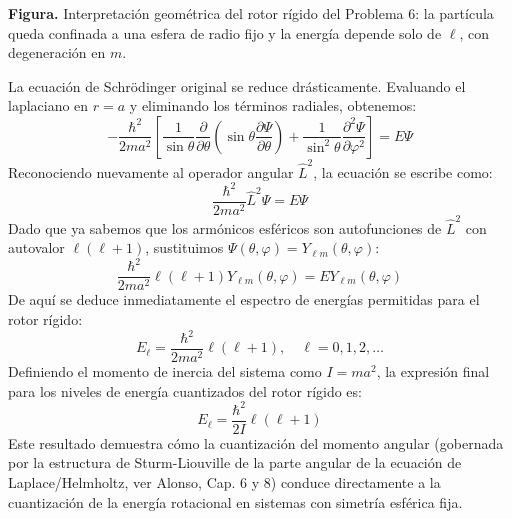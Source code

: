 \documentclass[a4paper]{article}
\begin{document}
\begin{center}

\par\smallskip
{\small\textbf{Figura.} Interpretación geométrica del rotor rígido del Problema 6: la partícula queda confinada a una esfera de radio fijo y la energía depende solo de $\ell$, con degeneración en $m$.}
\end{center}

La ecuación de Schrödinger original se reduce drásticamente. Evaluando el laplaciano en $r=a$ y eliminando los términos radiales, obtenemos:
$$
-\frac{\hbar^2}{2ma^2} \left[ \frac{1}{\sin\theta}\frac{\partial}{\partial \theta}\left(\sin\theta\frac{\partial \Psi}{\partial \theta}\right) + \frac{1}{\sin^2\theta}\frac{\partial^2 \Psi}{\partial \varphi^2} \right] = E\Psi
$$
Reconociendo nuevamente al operador angular $\hat{L}^2$, la ecuación se escribe como:
$$
\frac{\hbar^2}{2ma^2} \hat{L}^2 \Psi = E\Psi
$$
Dado que ya sabemos que los armónicos esféricos son autofunciones de $\hat{L}^2$ con autovalor $\ell(\ell+1)$, sustituimos $\Psi(\theta, \varphi) = Y_{\ell m}(\theta, \varphi)$:
$$
\frac{\hbar^2}{2ma^2} \ell(\ell+1) Y_{\ell m}(\theta, \varphi) = E Y_{\ell m}(\theta, \varphi)
$$
De aquí se deduce inmediatamente el espectro de energías permitidas para el rotor rígido:
$$
E_\ell = \frac{\hbar^2}{2ma^2} \ell(\ell+1), \quad \ell = 0, 1, 2, \dots
$$
Definiendo el momento de inercia del sistema como $I = ma^2$, la expresión final para los niveles de energía cuantizados del rotor rígido es:
$$
E_\ell = \frac{\hbar^2}{2I} \ell(\ell+1)
$$
Este resultado demuestra cómo la cuantización del momento angular (gobernada por la estructura de Sturm-Liouville de la parte angular de la ecuación de Laplace/Helmholtz, ver Alonso, Cap. 6 y 8) conduce directamente a la cuantización de la energía rotacional en sistemas con simetría esférica fija.
\end{document}
